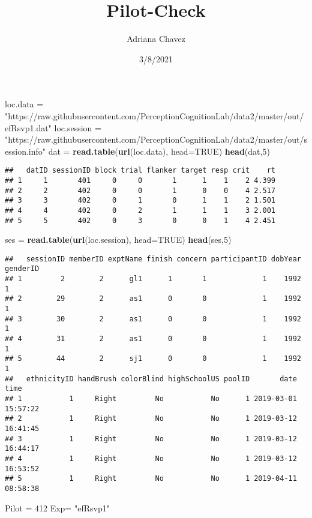 \documentclass[
]{article}
\title{Pilot-Check}
\author{Adriana Chavez}
\date{3/8/2021}
\newenvironment{Shaded}{\begin{snugshade}}{\end{snugshade}}
\newcommand{\DataTypeTok}[1]{\textcolor[rgb]{0.13,0.29,0.53}{#1}}
\newcommand{\DecValTok}[1]{\textcolor[rgb]{0.00,0.00,0.81}{#1}}
\newcommand{\KeywordTok}[1]{\textcolor[rgb]{0.13,0.29,0.53}{\textbf{#1}}}
\newcommand{\NormalTok}[1]{#1}
\newcommand{\OtherTok}[1]{\textcolor[rgb]{0.56,0.35,0.01}{#1}}
\newcommand{\StringTok}[1]{\textcolor[rgb]{0.31,0.60,0.02}{#1}}
\begin{document}
\maketitle

\begin{Shaded}
\begin{Highlighting}[]
\NormalTok{loc.data =}\StringTok{ "https://raw.githubusercontent.com/PerceptionCognitionLab/data2/master/out/efRsvp1.dat"}
\NormalTok{loc.session =}\StringTok{ "https://raw.githubusercontent.com/PerceptionCognitionLab/data2/master/out/session.info"}
\NormalTok{dat =}\StringTok{ }\KeywordTok{read.table}\NormalTok{(}\KeywordTok{url}\NormalTok{(loc.data), }\DataTypeTok{head=}\OtherTok{TRUE}\NormalTok{)}
\KeywordTok{head}\NormalTok{(dat,}\DecValTok{5}\NormalTok{)}
\end{Highlighting}
\end{Shaded}

\begin{verbatim}
##   datID sessionID block trial flanker target resp crit    rt
## 1     1       401     0     0       1      1    1    2 4.399
## 2     2       402     0     0       1      0    0    4 2.517
## 3     3       402     0     1       0      1    1    2 1.501
## 4     4       402     0     2       1      1    1    3 2.001
## 5     5       402     0     3       0      0    1    4 2.451
\end{verbatim}

\begin{Shaded}
\begin{Highlighting}[]
\NormalTok{ses =}\StringTok{ }\KeywordTok{read.table}\NormalTok{(}\KeywordTok{url}\NormalTok{(loc.session), }\DataTypeTok{head=}\OtherTok{TRUE}\NormalTok{)}
\KeywordTok{head}\NormalTok{(ses,}\DecValTok{5}\NormalTok{)}
\end{Highlighting}
\end{Shaded}

\begin{verbatim}
##   sessionID memberID exptName finish concern participantID dobYear genderID
## 1         2        2      gl1      1       1             1    1992        1
## 2        29        2      as1      0       0             1    1992        1
## 3        30        2      as1      0       0             1    1992        1
## 4        31        2      as1      0       0             1    1992        1
## 5        44        2      sj1      0       0             1    1992        1
##   ethnicityID handBrush colorBlind highSchoolUS poolID       date     time
## 1           1     Right         No           No      1 2019-03-01 15:57:22
## 2           1     Right         No           No      1 2019-03-12 16:41:45
## 3           1     Right         No           No      1 2019-03-12 16:44:17
## 4           1     Right         No           No      1 2019-03-12 16:53:52
## 5           1     Right         No           No      1 2019-04-11 08:58:38
\end{verbatim}

\begin{Shaded}
\begin{Highlighting}[]
\NormalTok{Pilot =}\StringTok{ }\DecValTok{412}
\NormalTok{Exp=}\StringTok{ "efRsvp1"}
\end{Highlighting}
\end{Shaded}
\end{document}
